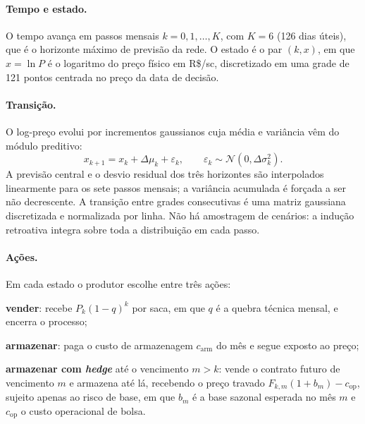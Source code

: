 \paragraph{Tempo e estado.} O tempo avança em passos mensais $k = 0, 1, \ldots, K$, com $K = 6$ (126 dias úteis), que é o horizonte máximo de previsão da rede. O estado é o par $(k, x)$, em que $x = \ln P$ é o logaritmo do preço físico em R\$/sc, discretizado em uma grade de 121 pontos centrada no preço da data de decisão.

\paragraph{Transição.} O log-preço evolui por incrementos gaussianos cuja média e variância vêm do módulo preditivo:
\begin{equation}
	x_{k+1} = x_k + \Delta\mu_k + \varepsilon_k, \qquad \varepsilon_k \sim \mathcal{N}(0, \Delta\sigma_k^2).
\end{equation}
A previsão central e o desvio residual dos três horizontes são interpolados linearmente para os sete passos mensais; a variância acumulada é forçada a ser não decrescente. A transição entre grades consecutivas é uma matriz gaussiana discretizada e normalizada por linha. Não há amostragem de cenários: a indução retroativa integra sobre toda a distribuição em cada passo.

\paragraph{Ações.} Em cada estado o produtor escolhe entre três ações:
\begin{alineas}
	\item \textbf{vender}: recebe $P_k (1-q)^k$ por saca, em que $q$ é a quebra técnica mensal, e encerra o processo;
	\item \textbf{armazenar}: paga o custo de armazenagem $c_{\text{arm}}$ do mês e segue exposto ao preço;
	\item \textbf{armazenar com \textit{hedge}} até o vencimento $m > k$: vende o contrato futuro de vencimento $m$ e armazena até lá, recebendo o preço travado $F_{k,m}(1 + b_m) - c_{\text{op}}$, sujeito apenas ao risco de base, em que $b_m$ é a base sazonal esperada no mês $m$ e $c_{\text{op}}$ o custo operacional de bolsa.
\end{alineas}

